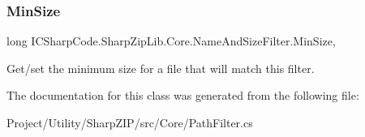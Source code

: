 \subsubsection{\texorpdfstring{Min\+Size}{MinSize}}
{\footnotesize\ttfamily long I\+C\+Sharp\+Code.\+Sharp\+Zip\+Lib.\+Core.\+Name\+And\+Size\+Filter.\+Min\+Size\hspace{0.3cm}{\ttfamily [get]}, {\ttfamily [set]}}



Get/set the minimum size for a file that will match this filter. 



The documentation for this class was generated from the following file\+:\begin{DoxyCompactItemize}
\item 
Project/\+Utility/\+Sharp\+Z\+I\+P/src/\+Core/Path\+Filter.\+cs\end{DoxyCompactItemize}
